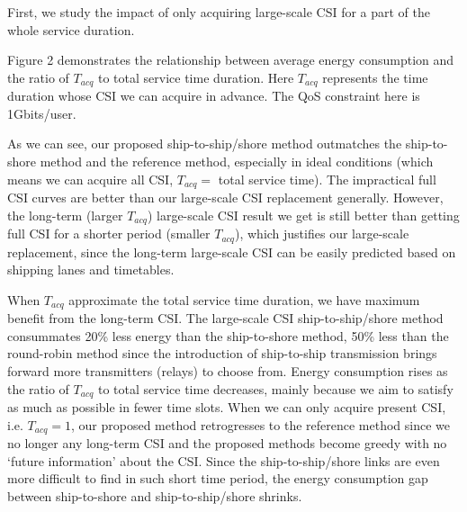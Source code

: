 \documentclass[conference]{IEEEtran}
\begin{document}

First, we study the impact of only acquiring large-scale CSI for a part of the whole service duration. 

Figure 2 demonstrates the relationship between average energy consumption and the ratio of ${T_{acq}}$ to total service time duration. Here ${T_{acq}}$ represents the time duration whose CSI we can acquire in advance. The QoS constraint here is 1Gbits/user. 



As we can see, our proposed ship-to-ship/shore method outmatches the ship-to-shore method and the reference method, especially in ideal conditions (which means we can acquire all CSI, ${T_{acq}}=$ total service time). 
The impractical full CSI curves are better than our large-scale CSI replacement generally. 
However, the long-term (larger $T_{acq}$) large-scale CSI result we get is still better than getting full CSI for a shorter period (smaller $T_{acq}$), which justifies our large-scale replacement, since the long-term large-scale CSI can be easily predicted based on shipping lanes and timetables. 

When ${T_{acq}}$ approximate the total service time duration, we have maximum benefit from the long-term CSI. The large-scale CSI ship-to-ship/shore method consummates 20\% less energy than the ship-to-shore method, 50\% less than the round-robin method since the introduction of ship-to-ship transmission brings forward more transmitters (relays) to choose from. 
Energy consumption rises as the ratio of ${T_{acq}}$ to total service time decreases, mainly because we aim to satisfy as much as possible in fewer time slots. When we can only acquire present CSI, i.e. ${T_{acq}} = 1$, our proposed method retrogresses to the reference method since we no longer any long-term CSI and the proposed methods become greedy with no `future information' about the CSI. Since the ship-to-ship/shore links are even more difficult to find in such short time period, the energy consumption gap between ship-to-shore and ship-to-ship/shore shrinks.  
\end{document}
